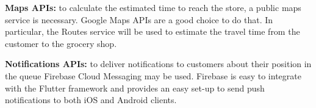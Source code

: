 \textbf{Maps APIs:}
to calculate the estimated time to reach the store, a public maps service is necessary. Google Maps APIs are a good choice to do that. In particular, the Routes service will be used to estimate the travel time from the customer to the grocery shop.

\bigbreak
\textbf{Notifications APIs:}
to deliver notifications to customers about their position in the queue Firebase Cloud Messaging may be used. Firebase is easy to integrate with the Flutter framework and provides an easy set-up to send push notifications to both iOS and Android clients.